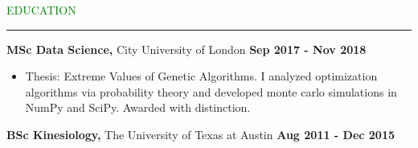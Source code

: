 \documentclass [
        11pt
] {article}
\begin{document}
\vspace*{10pt}


\noindent\textcolor{green}{EDUCATION \rule{16cm}{1pt}}

\vspace*{10pt}

\noindent \textbf {MSc Data Science,} City University of London
\hspace*{\fill} \textbf {Sep 2017 - Nov 2018}

\begin{itemize}[noitemsep,topsep=0pt]
\renewcommand{\labelitemi}{\scriptsize$\blacksquare$}
\item Thesis: Extreme Values of Genetic Algorithms.
I analyzed optimization algorithms via probability theory and
developed monte carlo simulations in NumPy and SciPy.
Awarded with distinction.
\end{itemize}

\noindent \textbf {BSc Kinesiology,} The University of Texas at Austin
\hspace*{\fill} \textbf {Aug 2011 - Dec 2015}
\end{document}
